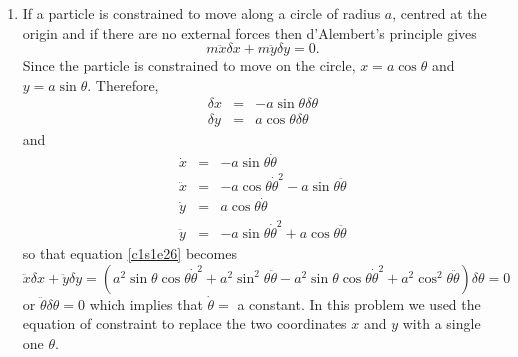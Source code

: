 \begin{enumerate}
\item If a particle is constrained to move along a circle of radius $a$,
centred at the origin and if there are no external forces then d'Alembert's 
principle gives
\begin{equation}\label{c1s1e26}
m\ddot{x}\delta x + m\ddot{y}\delta y = 0.
\end{equation}
Since the particle is constrained to move on the circle, $x = a\cos\theta$ 
and $y = a\sin\theta$. Therefore,
\begin{eqnarray}
\delta x &=& -a\sin\theta \delta\theta \\
\delta y &=& a\cos\theta  \delta\theta
\end{eqnarray}
and
\begin{eqnarray}
\dot{x} &=& -a\sin\theta\dot{\theta} \\
\ddot{x} &=& -a\cos\theta\dot{\theta}^2 - a\sin\theta\ddot{\theta} \\
\dot{y} &=& a\cos\theta\dot{\theta} \\
\ddot{y} &=& -a\sin\theta\dot{\theta}^2 + a\cos\theta\ddot{\theta}
\end{eqnarray}
so that equation \eqref{c1s1e26} becomes
\[
\ddot{x}\delta x + \ddot{y}\delta y = (a^2\sin\theta\cos\theta
\dot{\theta}^2 + a^2\sin^2\theta\ddot{\theta} - a^2\sin\theta\cos\theta
\dot{\theta}^2 + a^2\cos^2\theta\ddot{\theta})\delta\theta = 0
\]
or $\ddot{\theta}\delta\theta = 0$ which implies that $\dot{\theta} = $ a
constant. In this problem we used the equation of constraint to replace
the two coordinates $x$ and $y$ with a single one $\theta$.
\end{enumerate}


